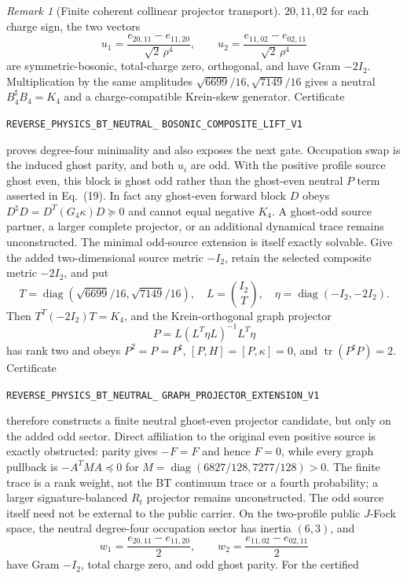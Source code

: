 \documentclass[11pt]{article}
\theoremstyle{definition}
\theoremstyle{remark}
\newtheorem{remark}[theorem]{Remark}
\begin{document}
\begin{remark}[Finite coherent collinear projector transport]
$20,11,02$ for each charge sign, the two vectors
\[
 u_1=\frac{e_{20,11}-e_{11,20}}{\sqrt2\,\rho^4},\qquad
 u_2=\frac{e_{11,02}-e_{02,11}}{\sqrt2\,\rho^4}
\]
are symmetric-bosonic, total-charge zero, orthogonal, and have Gram
$-2I_2$.  Multiplication by the same amplitudes
$\sqrt{6699}/16,\sqrt{7149}/16$ gives a neutral
$B_4^\sharp B_4=K_4$ and a charge-compatible Krein-skew generator.
Certificate
\par\noindent
\texttt{REVERSE\_PHYSICS\_BT\_NEUTRAL\_}\allowbreak
\texttt{BOSONIC\_COMPOSITE\_LIFT\_V1}
\par\noindent
proves degree-four minimality and also exposes the next gate.  Occupation
swap is the induced ghost parity, and both $u_i$ are odd.  With the positive
profile source ghost even, this block is ghost odd rather than the ghost-even
neutral $P$ term asserted in Eq.~(19).  In fact any ghost-even forward block
$D$ obeys $D^\sharp D=D^T(G_4\kappa)D\succeq0$ and cannot equal negative
$K_4$.  A ghost-odd source partner, a larger
complete projector, or an additional dynamical trace remains unconstructed.
The minimal odd-source extension is itself exactly solvable.  Give the added
two-dimensional source metric $-I_2$, retain the selected composite metric
$-2I_2$, and put
\[
 T=\operatorname{diag}(\sqrt{6699}/16,\sqrt{7149}/16),\quad
 L=\binom{I_2}{T},\quad
 \eta=\operatorname{diag}(-I_2,-2I_2).
\]
Then $T^T(-2I_2)T=K_4$, and the Krein-orthogonal graph projector
\[
 P=L(L^T\eta L)^{-1}L^T\eta
\]
has rank two and obeys
$P^2=P=P^\sharp$, $[P,H]=[P,\kappa]=0$, and
$\operatorname{tr}(P^\sharp P)=2$.  Certificate
\par\noindent
\texttt{REVERSE\_PHYSICS\_BT\_NEUTRAL\_}\allowbreak
\texttt{GRAPH\_PROJECTOR\_EXTENSION\_V1}
\par\noindent
therefore constructs a finite neutral ghost-even projector candidate, but
only on the added odd sector.  Direct affiliation to the original even
positive source is exactly obstructed: parity gives $-F=F$ and hence $F=0$,
while every graph pullback is $-A^TMA\preceq0$ for
$M=\operatorname{diag}(6827/128,7277/128)>0$.  The finite trace is a rank
weight, not the BT continuum trace or a fourth probability; a larger
signature-balanced $R_t$ projector remains unconstructed.
The odd source itself need not be external to the public carrier.  On the
two-profile public $J$-Fock space, the neutral degree-four occupation sector
has inertia $(6,3)$, and
\[
 w_1=\frac{e_{20,11}-e_{11,20}}2,\qquad
 w_2=\frac{e_{11,02}-e_{02,11}}2
\]
have Gram $-I_2$, total charge zero, and odd ghost parity.  For the certified

\end{remark}
\end{document}
